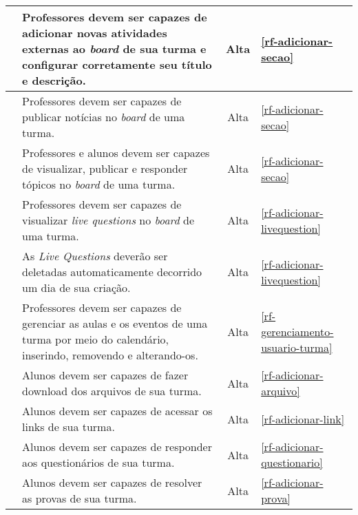\begin{longtable}{|c|p{10cm}|c|p{2cm}|}
	\RF\label{rf-adicionar-atividadeexterna}  & Professores devem ser capazes de adicionar novas atividades externas ao \textit{board} de sua turma e configurar corretamente seu título e descrição. & Alta & \ref{rf-adicionar-secao} \\
	\hline  
	
	\RF\label{rf-adicionar-noticia}  & Professores devem ser capazes de publicar notícias no \textit{board} de uma turma. & 	Alta &  \ref{rf-adicionar-secao} \\
	\hline 
	
	\RF\label{rf-gerenciamento-forum}  & Professores e alunos devem ser capazes de visualizar, publicar e responder tópicos no \textit{board} de uma turma. & 	Alta &  \ref{rf-adicionar-secao} \\
	\hline
	
	\RF\label{rf-visualizar-livequestions}  & Professores devem ser capazes de visualizar \textit{live questions} no \textit{board} de uma turma. & 	Alta &  \ref{rf-adicionar-livequestion} \\ \hline
	
	\RF\label{rf-deletar-livequestions}  & As \textit{Live Questions} deverão ser deletadas automaticamente decorrido um dia de sua criação. & 	Alta &  \ref{rf-adicionar-livequestion} \\
	\hline
	
	\RF\label{rf-gerenciamento-calendario}  & Professores devem ser capazes de gerenciar as aulas e os eventos de uma turma por meio do calendário, inserindo, removendo e alterando-os. & 	Alta &  \ref{rf-gerenciamento-usuario-turma} \\ \hline

	\RF\label{rf-acessar-arquivo}  &  Alunos devem ser capazes de fazer download dos arquivos de sua turma. & Alta & \ref{rf-adicionar-arquivo} \\
	\hline

	\RF\label{rf-acessar-link}  &  Alunos devem ser capazes de acessar os links de sua turma. & Alta & \ref{rf-adicionar-link} \\
	\hline

	\RF\label{rf-acessar-questionario}  &  Alunos devem ser capazes de  responder aos questionários de sua turma. & Alta & \ref{rf-adicionar-questionario} \\
	\hline

	\RF\label{rf-acessar-prova}  &  Alunos devem ser capazes de resolver as provas de sua turma. & Alta & \ref{rf-adicionar-prova} \\
	\hline


\end{longtable}
